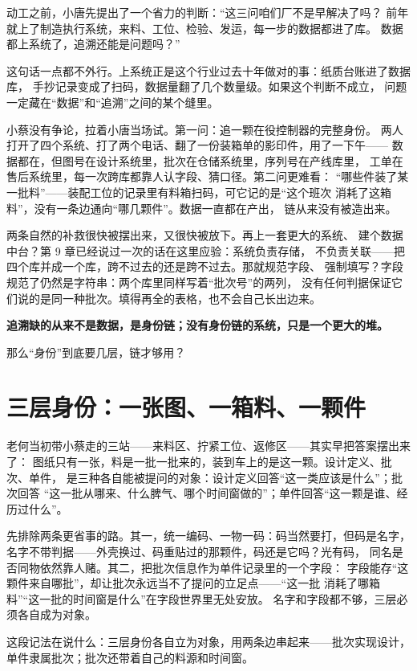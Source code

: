 动工之前，小唐先提出了一个省力的判断：“这三问咱们厂不是早解决了吗？
前年就上了制造执行系统，来料、工位、检验、发运，每一步的数据都进了库。
数据都上系统了，追溯还能是问题吗？”

这句话一点都不外行。上系统正是这个行业过去十年做对的事：纸质台账进了数据库，
手抄记录变成了扫码，数据量翻了几个数量级。如果这个判断不成立，
问题一定藏在“数据”和“追溯”之间的某个缝里。

小蔡没有争论，拉着小唐当场试。第一问：追一颗在役控制器的完整身份。
两人打开了四个系统、打了两个电话、翻了一份装箱单的影印件，用了一下午——
数据都在，但图号在设计系统里，批次在仓储系统里，序列号在产线库里，
工单在售后系统里，每一次跨库都靠人认字段、猜口径。第二问更难看：
“哪些件装了某一批料”——装配工位的记录里有料箱扫码，可它记的是“这个班次
消耗了这箱料”，没有一条边通向“哪几颗件”。数据一直都在产出，
链从来没有被造出来。

两条自然的补救很快被摆出来，又很快被放下。再上一套更大的系统、
建个数据中台？第 9 章已经说过一次的话在这里应验：系统负责存储，
不负责关联——把四个库并成一个库，跨不过去的还是跨不过去。那就规范字段、
强制填写？字段规范了仍然是字符串：两个库里同样写着“批次号”的两列，
没有任何判据保证它们说的是同一种批次。填得再全的表格，也不会自己长出边来。

\textbf{追溯缺的从来不是数据，是身份链；没有身份链的系统，只是一个更大的堆。}

那么“身份”到底要几层，链才够用？

\section{三层身份：一张图、一箱料、一颗件}

老何当初带小蔡走的三站——来料区、拧紧工位、返修区——其实早把答案摆出来了：
图纸只有一张，料是一批一批来的，装到车上的是这一颗。设计定义、批次、单件，
是三种各自能被提问的对象：设计定义回答“这一类应该是什么”；批次回答
“这一批从哪来、什么脾气、哪个时间窗做的”；单件回答“这一颗是谁、经历过什么”。

先排除两条更省事的路。其一，统一编码、一物一码：码当然要打，但码是名字，
名字不带判据——外壳换过、码重贴过的那颗件，码还是它吗？光有码，
同名是否同物依然靠人赌。其二，把批次信息作为单件记录里的一个字段：
字段能存“这颗件来自哪批”，却让批次永远当不了提问的立足点——“这一批
消耗了哪箱料”“这一批的时间窗是什么”在字段世界里无处安放。
名字和字段都不够，三层必须各自成为对象。

这段记法在说什么：三层身份各自立为对象，用两条边串起来——批次实现设计，
单件隶属批次；批次还带着自己的料源和时间窗。

